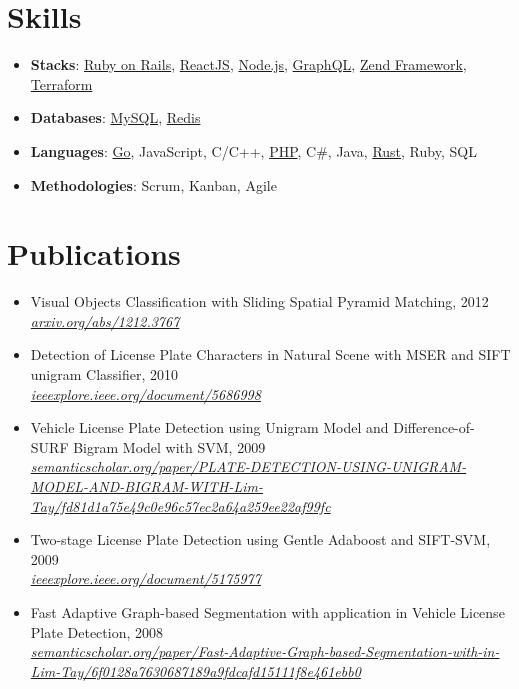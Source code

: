 \documentclass[12pt,twoside,a4paper]{article}
\newcommand{\resumeSubHeadingListStart}{\begin{itemize}[leftmargin=*]}
\newcommand{\resumeSubHeadingListEnd}{\end{itemize}}
\begin{document}
\section{Skills}
 \resumeSubHeadingListStart
   \item{
     \textbf{Stacks}{: \href{https://rubyonrails.org/}{Ruby on Rails}, \href{https://reactjs.org/}{ReactJS}, \href{https://nodejs.org/}{Node.js}, \href{https://graphql.org/}{GraphQL}, \href{https://framework.zend.com/}{Zend Framework}, \href{https://www.terraform.io/}{Terraform}}
   }
   \item{
     \textbf{Databases}{: \href{https://www.mysql.com/}{MySQL}, \href{https://redis.io/}{Redis}}
   }
   \item{
     \textbf{Languages}{: \href{https://golang.org/}{Go}, JavaScript, C/C++, \href{https://www.php.net/}{PHP}, C\#, Java, \href{https://www.rust-lang.org/}{Rust}, Ruby, SQL}
   }
   \item{
     \textbf{Methodologies}{: Scrum, Kanban, Agile}
   }
 \resumeSubHeadingListEnd

\section{Publications}
 \resumeSubHeadingListStart
   \item{
     {Visual Objects Classification with Sliding Spatial Pyramid Matching, 2012}{\\\textit{\href{https://arxiv.org/abs/1212.3767}{arxiv.org/abs/1212.3767}}}
   }
   \item{
     {Detection of License Plate Characters in Natural Scene with MSER and SIFT unigram Classifier, 2010}{\\\textit{\href{https://ieeexplore.ieee.org/document/5686998}{ieeexplore.ieee.org/document/5686998}}}
   }
   \item{
     {Vehicle License Plate Detection using Unigram Model and Difference-of-SURF Bigram Model with SVM, 2009}{\\\textit{\href{https://www.semanticscholar.org/paper/PLATE-DETECTION-USING-UNIGRAM-MODEL-AND-BIGRAM-WITH-Lim-Tay/fd81d1a75e49c0e96c57ec2a64a259ee22af99fc}{semanticscholar.org/paper/PLATE-DETECTION-USING-UNIGRAM-MODEL-AND-BIGRAM-WITH-Lim-Tay/fd81d1a75e49c0e96c57ec2a64a259ee22af99fc}}}
   }
   \item{
     {Two-stage License Plate Detection using Gentle Adaboost and SIFT-SVM, 2009}{\\\textit{\href{https://ieeexplore.ieee.org/document/5175977}{ieeexplore.ieee.org/document/5175977}}}
   }
   \item{
     {Fast Adaptive Graph-based Segmentation with application in Vehicle License Plate Detection, 2008}{\\\textit{\href{https://www.semanticscholar.org/paper/Fast-Adaptive-Graph-based-Segmentation-with-in-Lim-Tay/6f0128a7630687189a9fdcafd15111f8e461ebb0}{semanticscholar.org/paper/Fast-Adaptive-Graph-based-Segmentation-with-in-Lim-Tay/6f0128a7630687189a9fdcafd15111f8e461ebb0}}}
   }
 \resumeSubHeadingListEnd

\end{document}
